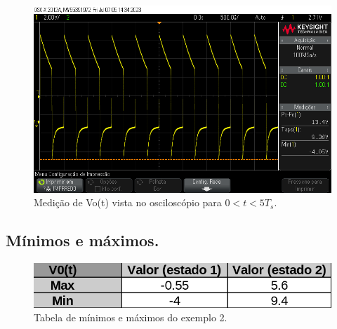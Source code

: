 \begin{figure}[h]
    \label{fig:ex2}
    \centering
    \includegraphics[width=0.7\columnwidth]{images/exemplo2.png}
    \caption{Medição de Vo(t) vista no osciloscópio para $0 < t < 5 T_s$.}
\end{figure}

\subsection{Mínimos e máximos.}

\begin{figure}[h]
    \label{fig:minmax_ex2}
    \centering
    \includegraphics[width=0.5\columnwidth]{images/minmax_ex2.png}
    \caption{Tabela de mínimos e máximos do exemplo 2.}
\end{figure}


